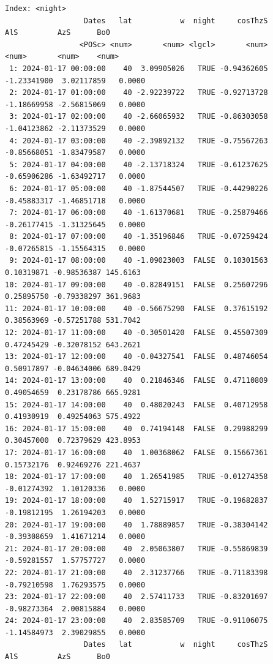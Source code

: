 \begin{verbatim}
Index: <night>
                  Dates   lat           w  night     cosThzS         AlS         AzS      Bo0
                 <POSc> <num>       <num> <lgcl>       <num>       <num>       <num>    <num>
 1: 2024-01-17 00:00:00    40  3.09905026   TRUE -0.94362605 -1.23341900  3.02117859   0.0000
 2: 2024-01-17 01:00:00    40 -2.92239722   TRUE -0.92713728 -1.18669958 -2.56815069   0.0000
 3: 2024-01-17 02:00:00    40 -2.66065932   TRUE -0.86303058 -1.04123862 -2.11373529   0.0000
 4: 2024-01-17 03:00:00    40 -2.39892132   TRUE -0.75567263 -0.85668051 -1.83479587   0.0000
 5: 2024-01-17 04:00:00    40 -2.13718324   TRUE -0.61237625 -0.65906286 -1.63492717   0.0000
 6: 2024-01-17 05:00:00    40 -1.87544507   TRUE -0.44290226 -0.45883317 -1.46851718   0.0000
 7: 2024-01-17 06:00:00    40 -1.61370681   TRUE -0.25879466 -0.26177415 -1.31325645   0.0000
 8: 2024-01-17 07:00:00    40 -1.35196846   TRUE -0.07259424 -0.07265815 -1.15564315   0.0000
 9: 2024-01-17 08:00:00    40 -1.09023003  FALSE  0.10301563  0.10319871 -0.98536387 145.6163
10: 2024-01-17 09:00:00    40 -0.82849151  FALSE  0.25607296  0.25895750 -0.79338297 361.9683
11: 2024-01-17 10:00:00    40 -0.56675290  FALSE  0.37615192  0.38563969 -0.57251788 531.7042
12: 2024-01-17 11:00:00    40 -0.30501420  FALSE  0.45507309  0.47245429 -0.32078152 643.2621
13: 2024-01-17 12:00:00    40 -0.04327541  FALSE  0.48746054  0.50917897 -0.04634006 689.0429
14: 2024-01-17 13:00:00    40  0.21846346  FALSE  0.47110809  0.49054659  0.23178786 665.9281
15: 2024-01-17 14:00:00    40  0.48020243  FALSE  0.40712958  0.41930919  0.49254063 575.4922
16: 2024-01-17 15:00:00    40  0.74194148  FALSE  0.29988299  0.30457000  0.72379629 423.8953
17: 2024-01-17 16:00:00    40  1.00368062  FALSE  0.15667361  0.15732176  0.92469276 221.4637
18: 2024-01-17 17:00:00    40  1.26541985   TRUE -0.01274358 -0.01274392  1.10120336   0.0000
19: 2024-01-17 18:00:00    40  1.52715917   TRUE -0.19682837 -0.19812195  1.26194203   0.0000
20: 2024-01-17 19:00:00    40  1.78889857   TRUE -0.38304142 -0.39308659  1.41671214   0.0000
21: 2024-01-17 20:00:00    40  2.05063807   TRUE -0.55869839 -0.59281557  1.57757727   0.0000
22: 2024-01-17 21:00:00    40  2.31237766   TRUE -0.71183398 -0.79210598  1.76293575   0.0000
23: 2024-01-17 22:00:00    40  2.57411733   TRUE -0.83201697 -0.98273364  2.00815884   0.0000
24: 2024-01-17 23:00:00    40  2.83585709   TRUE -0.91106075 -1.14584973  2.39029855   0.0000
                  Dates   lat           w  night     cosThzS         AlS         AzS      Bo0
\end{verbatim}

